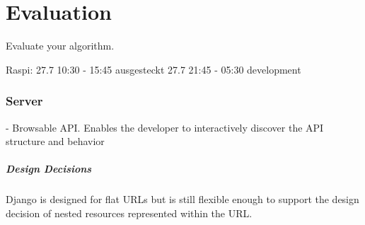 \chapter{Evaluation}
\label{sec:evaluation}

Evaluate your algorithm.

Raspi: 27.7 10:30 - 15:45 ausgesteckt
27.7 21:45 - 05:30 development

\subsection{Server}

- Browsable API. Enables the developer to interactively discover the API structure and behavior

\paragraph{Design Decisions}

Django is designed for flat URLs but is still flexible enough to support the design decision of nested resources represented within the URL.